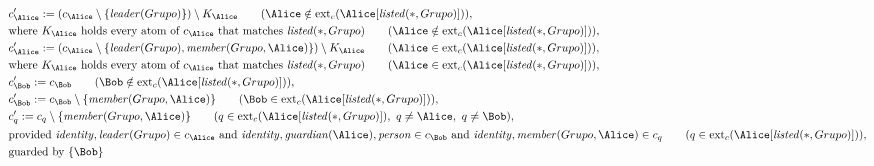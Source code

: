 \begin{align*}
&
c'_
{
\Alice
}
 := 
(c_
{
\Alice
}
 \setminus 
\{
\mathit{\detokenize{
leader
}}
(
Grupo
)
\}
) \setminus K_
{
\Alice
}
 \qquad (
\Alice
 \notin 
\mathrm{ext}_c(
\Alice
[
\mathit{\detokenize{
listed
}}
(
\ast
,
Grupo
)
]
)
)
,\\
&
\text{where } K_
{
\Alice
}
 \text{ holds every atom of } c_
{
\Alice
}
 \text{ that matches } 
\mathit{\detokenize{
listed
}}
(
\ast
,
Grupo
)
 \qquad (
\Alice
 \notin 
\mathrm{ext}_c(
\Alice
[
\mathit{\detokenize{
listed
}}
(
\ast
,
Grupo
)
]
)
)
,\\
&
c'_
{
\Alice
}
 := 
(c_
{
\Alice
}
 \setminus 
\{
\mathit{\detokenize{
leader
}}
(
Grupo
)
,
\mathit{\detokenize{
member
}}
(
Grupo
,
\Alice
)
\}
) \setminus K_
{
\Alice
}
 \qquad (
\Alice
 \in 
\mathrm{ext}_c(
\Alice
[
\mathit{\detokenize{
listed
}}
(
\ast
,
Grupo
)
]
)
)
,\\
&
\text{where } K_
{
\Alice
}
 \text{ holds every atom of } c_
{
\Alice
}
 \text{ that matches } 
\mathit{\detokenize{
listed
}}
(
\ast
,
Grupo
)
 \qquad (
\Alice
 \in 
\mathrm{ext}_c(
\Alice
[
\mathit{\detokenize{
listed
}}
(
\ast
,
Grupo
)
]
)
)
,\\
&
c'_
{
\Bob
}
 := 
c_
{
\Bob
}
 \qquad (
\Bob
 \notin 
\mathrm{ext}_c(
\Alice
[
\mathit{\detokenize{
listed
}}
(
\ast
,
Grupo
)
]
)
)
,\\
&
c'_
{
\Bob
}
 := 
c_
{
\Bob
}
 \setminus 
\{
\mathit{\detokenize{
member
}}
(
Grupo
,
\Alice
)
\}
 \qquad (
\Bob
 \in 
\mathrm{ext}_c(
\Alice
[
\mathit{\detokenize{
listed
}}
(
\ast
,
Grupo
)
]
)
)
,\\
&
c'_
q
 := 
c_
q
 \setminus 
\{
\mathit{\detokenize{
member
}}
(
Grupo
,
\Alice
)
\}
 \qquad (
q
 \in 
\mathrm{ext}_c(
\Alice
[
\mathit{\detokenize{
listed
}}
(
\ast
,
Grupo
)
]
)
,\ 
q \neq 
\Alice
,\ 
q \neq 
\Bob
)
,\\
&
\text{provided } 
\mathit{\detokenize{
identity
}}
,
\mathit{\detokenize{
leader
}}
(
Grupo
)
 \in c_
{
\Alice
}
 \text{ and } 
\mathit{\detokenize{
identity
}}
,
\mathit{\detokenize{
guardian
}}
(
\Alice
)
,
\mathit{\detokenize{
person
}}
 \in c_
{
\Bob
}
 \text{ and } 
\mathit{\detokenize{
identity
}}
,
\mathit{\detokenize{
member
}}
(
Grupo
,
\Alice
)
 \in c_
q
 \qquad (
q \in 
\mathrm{ext}_c(
\Alice
[
\mathit{\detokenize{
listed
}}
(
\ast
,
Grupo
)
]
)
)
,\\
&
\text{guarded by } \{
\Bob
\}
\end{align*}

